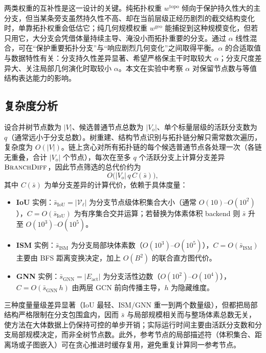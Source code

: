 \documentclass[twocolumn, a4paper, 10pt]{article}
\begin{document}
两类权重的互补性是这一设计的关键。纯拓扑权重 $w^{\mathrm{topo}}$ 倾向于保护持久性大的主分支，但当某条旁支虽然持久性不高、却在当前层级正经历剧烈的截交结构变化时，单靠拓扑权重会低估它；纯几何规模权重 $w^{\mathrm{geo}}$ 能捕捉到这种规模变化，但若只用它，大分支会凭借体量持续主导、淹没小而拓扑重要的分支。通过 $\alpha$ 线性混合，可在“保护重要拓扑分支”与“响应剧烈几何变化”之间取得平衡。$\alpha$ 的合适取值与数据特性有关：分支持久性差异显著、希望严格保主干时取较大 $\alpha$；分支尺度差异大、关注局部几何演化时取较小 $\alpha$。本文在实验中考察 $\alpha$ 对保留节点数与等值结构表达能力的影响。

\subsection{复杂度分析}

设合并树节点数为 $|V|$、候选普通节点总数为 $|V_o|$、单个标量层级的活跃分支数为 $q$（通常远小于分支总数）。树重建、结构节点识别与拓扑链分解只需常数次遍历，复杂度为 $O(|V|)$。链上贪心对所有拓扑链的每个候选普通节点各处理一次（各链无重叠，合计 $|V_o|$ 个节点），每次在至多 $q$ 个活跃分支上计算分支差异 $\textsc{BranchDiff}$，因此节点筛选的总代价约为
\begin{equation}
O\bigl(|V_o|\,q\,C(\bar{s})\bigr),
\end{equation}
其中 $C(\bar{s})$ 为单分支差异的计算代价，依赖于具体度量：
\begin{itemize}
\item \textbf{IoU} 实例：$\bar{s}_{\text{IoU}}=|\mathcal{V}_\ell|$ 为分支节点级体积集合大小（通常 $O(10)$–$O(10^2)$），$C=O(\bar{s}_{\text{IoU}})$ 为有序集合交并运算；若替换为体素体积 backend 则 $\bar{s}$ 升至 $O(10^3)$–$O(10^5)$。
\item \textbf{ISM} 实例：$\bar{s}_{\text{ISM}}$ 为分支局部块体素数（$O(10^3)$–$O(10^5)$），$C=O(\bar{s}_{\text{ISM}})$ 主要由 BFS 距离变换决定，加上 $O(B^2)$ 的联合直方图代价。
\item \textbf{GNN} 实例：$\bar{s}_{\text{GNN}}=|E_{\text{act}}|$ 为分支活性边数（$O(10^2)$–$O(10^4)$），$C=O(\bar{s}_{\text{GNN}}\,h)$ 由两层 GCN 前向传播主导，$h$ 为隐藏维度。
\end{itemize}
三种度量量级差异显著（IoU 最轻、ISM/GNN 重一到两个数量级），但都把局部结构严格限制在分支包围盒内，因而 $\bar{s}$ 与局部规模相关而与整场体素总数无关，使方法在大体数据上仍保持可控的单步开销；实际运行时间主要由活跃分支数和分支局部规模决定，而非全树节点数。此外，参考节点的局部描述符（体积集合、距离场或子图嵌入）可在贪心推进时缓存复用，避免重复计算同一参考节点。
\end{document}
